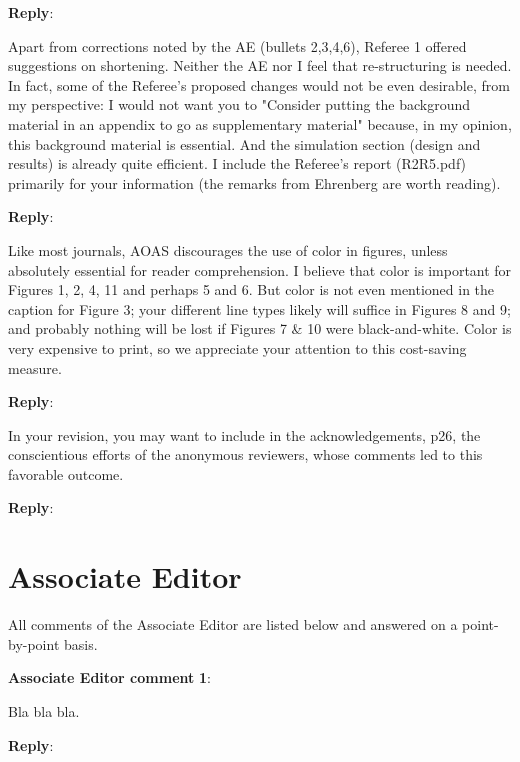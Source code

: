 \documentclass[a4paper]{article}
\newcounter{reviewer}
\def\aecom{\textbf{Associate Editor comment }}
\def\reply{\textbf{Reply}}
\begin{document}
\vspace{5mm}
\reply:

\vspace{5mm}
 Apart from corrections noted by the AE (bullets 2,3,4,6), Referee 1
offered suggestions on shortening. Neither the AE nor I feel that re-structuring is needed.  In fact, some of the Referee's proposed changes would not be even desirable, from my perspective: I would not want you to "Consider putting the background material in an appendix to go as supplementary material" because, in my opinion, this background material is essential. And the simulation section (design and results) is already quite efficient. I include the Referee's report (R2R5.pdf) primarily for your information (the remarks from Ehrenberg are worth reading).

\vspace{5mm}
\reply: 

\vspace{5mm}
 Like most journals, AOAS discourages the use of color in figures,
unless absolutely essential for reader comprehension.  I believe
that color is important for Figures 1, 2, 4, 11 and perhaps 5 and 6.
But color is not even mentioned in the caption for Figure 3; your
different line types likely will suffice in Figures 8 and 9; and
probably nothing will be lost if Figures 7 & 10 were black-and-white.
Color is very expensive to print, so we appreciate your attention
to this cost-saving measure.

\vspace{5mm}
\reply: 

\vspace{5mm}
 In your revision, you may want to include in the
acknowledgements, p26, the conscientious efforts of the anonymous
reviewers, whose comments led to this favorable outcome.

\vspace{5mm}
\reply: 

 \section*{Associate Editor}
All comments of the Associate Editor are listed below and answered on a point-by-point basis.

\setcounter{reviewer}{1}

\vspace{5mm}
\noindent \aecom \textbf{1}:

Bla bla bla.

\reply: 

\vspace{1em}


\footnotesize



\end{document}

